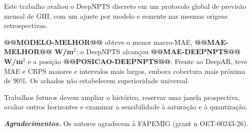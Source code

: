\documentclass[12pt,a4paper,fleqn]{article}
\begin{document}
Este trabalho avaliou o DeepNPTS discreto em um protocolo global de previsão mensal de GHI, com um ajuste por modelo e semente nas mesmas origens retrospectivas.

\textbf{@@MODELO-MELHOR@@} obteve o menor macro-MAE, \textbf{@@MAE-MELHOR@@ W/m$^2$}; o DeepNPTS alcançou \textbf{@@MAE-DEEPNPTS@@ W/m$^2$} e a posição \textbf{@@POSICAO-DEEPNPTS@@}. Frente ao DeepAR, teve MAE e CRPS maiores e intervalos mais largos, embora cobertura mais próxima de 90\%. Os achados não estabelecem superioridade universal.

Trabalhos futuros devem ampliar o histórico, reservar uma janela prospectiva, avaliar outros horizontes e examinar a sensibilidade à saturação e à quantização.

\vspace{12pt}
\noindent\textbf{\textit{Agradecimentos.}} Os autores agradecem à FAPEMIG (grant n OET-00243-26).
\end{document}
